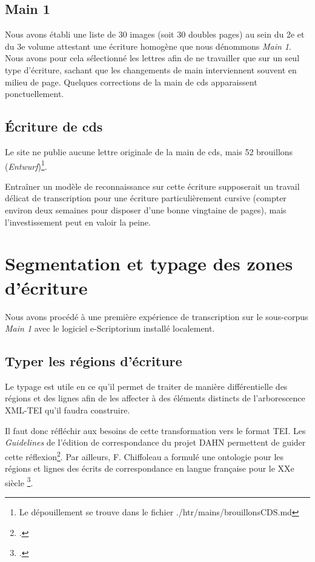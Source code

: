 \documentclass[a4paper,12pt,twoside]{book}
\begin{document}
			\subsection{Main 1}
			Nous avons établi une liste de 30 images (soit 30 doubles pages) au sein du 2e et du 3e volume attestant une écriture homogène que nous dénommons \textit{Main 1}. Nous avons pour cela sélectionné les lettres afin de ne travailler que sur un seul type d'écriture, sachant que les changements de main interviennent souvent en milieu de page. Quelques corrections de la main de \gls{cds} apparaissent ponctuellement.
		
			\subsection{Écriture de \gls{cds}}
			Le site ne publie aucune lettre originale de la main de \gls{cds}, mais 52 brouillons (\textit{Entwurf})\footnote{Le dépouillement se trouve dans le fichier \textsf{./htr/mains/brouillonsCDS.md}}.
		
			Entraîner un modèle de reconnaissance sur cette écriture supposerait un travail délicat de transcription pour une écriture particulièrement cursive (compter environ deux semaines pour disposer d'une bonne vingtaine de pages), mais l'investissement peut en valoir la peine.
		
		\section{Segmentation et typage des zones d'écriture}
		Nous avons procédé à une première expérience de transcription sur le sous-corpus \textit{Main 1} avec le logiciel e-Scriptorium installé localement. 
        
            \subsection{Typer les régions d'écriture}
            Le typage est utile en ce qu'il permet de traiter de manière différentielle des régions et des lignes afin de les affecter à des éléments distincts de l'arborescence XML-TEI qu'il faudra construire.
            
            Il faut donc réfléchir aux besoins de cette transformation vers le format TEI. Les \textit{Guidelines} de l'édition de correspondance du projet DAHN permettent de guider cette réflexion\footcite{chiffoleauCorrespondenceGuidelines2022}. Par ailleurs, F. Chiffoleau a formulé une ontologie pour les régions et lignes des écrits de correspondance en langue française pour le XXe siècle \footcite{chiffoleauCorrespondanceLangueFrancaise2021}.
				        
\end{document}
